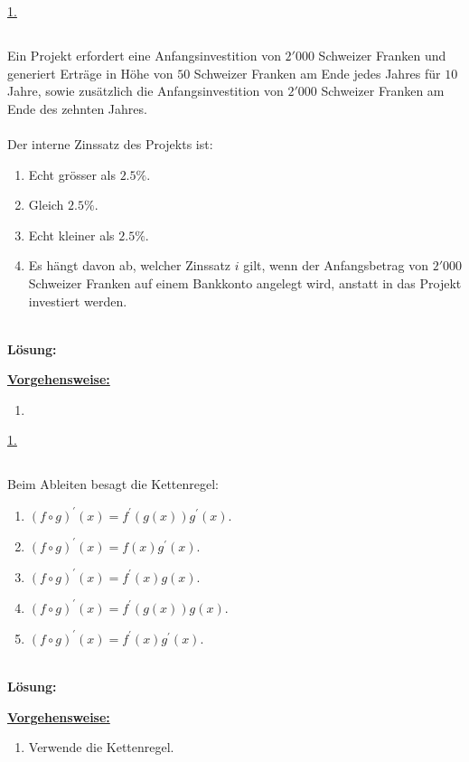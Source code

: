 \underline{1. }\\


\newpage
\subsection*{}
Ein Projekt erfordert eine Anfangsinvestition von $2'000$ Schweizer Franken und generiert Erträge in Höhe von $50$ Schweizer Franken am Ende jedes Jahres für $10$ Jahre, sowie zusätzlich die Anfangsinvestition von $2'000$ Schweizer Franken am Ende des zehnten Jahres.\\
\\
Der interne Zinssatz des Projekts ist:
\renewcommand{\labelenumi}{(\alph{enumi})}
\begin{enumerate}
	\item 
	Echt grösser als $2.5 \%$.
	\item 
	Gleich $2.5 \%$.
	\item
	Echt kleiner als $2.5 \%$.
	\item
	Es hängt davon ab, welcher Zinssatz $i$ gilt, wenn der Anfangsbetrag von $2'000$ Schweizer Franken auf einem Bankkonto angelegt wird, anstatt in das Projekt investiert werden.
\end{enumerate}
\ \\
\textbf{Lösung:}
\begin{mdframed}
\underline{\textbf{Vorgehensweise:}}
\renewcommand{\labelenumi}{\theenumi.}
\begin{enumerate}
\item 
\end{enumerate}
\end{mdframed}

\underline{1. }\\



 \newpage

\subsection*{}
Beim Ableiten besagt die Kettenregel:
\renewcommand{\labelenumi}{(\alph{enumi})}
\begin{enumerate}
	\item 
	$ (f \circ g)^\prime(x) = f^\prime(g(x)) g^\prime(x)$.
	\item 
	$ (f \circ g)^\prime(x) = f(x) g^\prime(x)$.
	\item
	$ (f \circ g)^\prime(x) = f^\prime(x) g(x)$.
	\item
	$ (f \circ g)^\prime(x) = f^\prime(g(x)) g(x)$.
	\item
	$ (f \circ g)^\prime(x) = f^\prime(x) g^\prime(x)$.
\end{enumerate}
\ \\
\textbf{Lösung:}
\begin{mdframed}
\underline{\textbf{Vorgehensweise:}}
\renewcommand{\labelenumi}{\theenumi.}
\begin{enumerate}
\item Verwende die Kettenregel.
\end{enumerate}
\end{mdframed}

